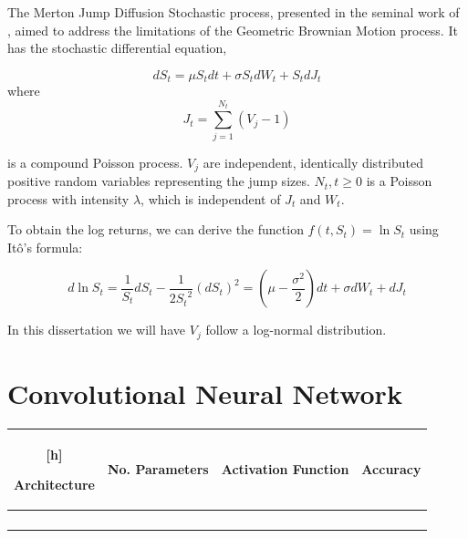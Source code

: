 \documentclass[11pt,oneside,openany,a4paper,english, report, goldenblock
]{usthesis}
\begin{document}
The Merton Jump Diffusion Stochastic process, presented in the seminal work of \citet{Merton}, aimed to address the limitations of the Geometric Brownian Motion process. It has the stochastic differential equation,

\begin{equation}
d S_t =  \mu S_t dt  +\sigma S_t dW_t + S_t dJ_t 
\end{equation}
where
\begin{equation}
J_t = \sum_{j=1}^{N_t}(V_j - 1)
\end{equation}

is a compound Poisson process. $V_j$ are independent, identically distributed positive random variables representing the jump sizes. $N_t, t \geq 0$ is a Poisson process with intensity $\lambda$, which is independent of $J_t$ and $W_t$.

To obtain the log returns, we can derive the function $f(t, S_t) = \ln{S_t}$ using It\^{o}'s formula:

\begin{equation}
d\ln{S_t} = \frac{1}{S_t}dS_t - \frac{1}{2{S_t}^2}\left(dS_t\right)^2 = \left( \mu - \frac{\sigma^2}{2} \right)dt +\sigma dW_t + dJ_t 
\end{equation}

In this dissertation we will have $V_j$ follow a log-normal distribution.

\section{Convolutional Neural Network}



\begin{tabular}{|c|c|c|c|}[h]
	
	Architecture & No. Parameters & Activation Function & Accuracy \\ 
	\hline
	&  &  &  \\ 
	 
	&  &  &  \\ 
	 
	&  &  &  \\ 
	 
	&  &  &  \\ 
	\hline 
\end{tabular} 



\end{document}
